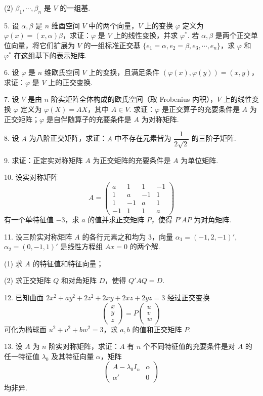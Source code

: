 \documentclass[UTF8,12pt,a4paper,fontset=fandol]{ctexart}
\begin{document}
(2) $\beta_1,\cdots,\beta_n$ 是 $V$ 的一组基.

5. 设 $\alpha,\beta$ 是 $n$ 维酉空间 $V$ 中的两个向量，$V$ 上的变换 $\varphi$ 定义为 $\varphi(x)=(x,\alpha)\beta$，求证：$\varphi$ 是 $V$ 上的线性变换，并求 $\varphi^*$. 若 $\alpha,\beta$ 是两个正交单位向量，将它们扩展为 $V$ 的一组标准正交基 $\{e_1=\alpha,e_2=\beta,e_3,\cdots,e_n\}$，求 $\varphi$ 和 $\varphi^*$ 在这组基下的表示矩阵.

6. 设 $\varphi$ 是 $n$ 维欧氏空间 $V$ 上的变换，且满足条件 $(\varphi(x),\varphi(y))=(x,y)$，求证：$\varphi$ 是 $V$ 上的正交变换.

7. 设 $V$ 是由 $n$ 阶实矩阵全体构成的欧氏空间（取 Frobenius 内积），$V$ 上的线性变换 $\varphi$ 定义为 $\varphi(X)=AX$，其中 $A\in V$. 求证：$\varphi$ 是正交算子的充要条件是 $A$ 为正交矩阵；$\varphi$ 是自伴随算子的充要条件是 $A$ 为对称矩阵.

8. 设 $A$ 为八阶正交矩阵，求证：$A$ 中不存在元素皆为 $\dfrac{1}{2\sqrt{2}}$ 的三阶子矩阵.

9. 求证：正定实对称矩阵 $A$ 为正交矩阵的充要条件是 $A$ 为单位矩阵.

10. 设实对称矩阵
\[
A=\begin{pmatrix}
a&1&1&-1\\
1&a&-1&1\\
1&-1&a&1\\
-1&1&1&a
\end{pmatrix}
\]
有一个单特征值 $-3$，求 $a$ 的值并求正交矩阵 $P$，使得 $P'AP$ 为对角矩阵.

11. 设三阶实对称矩阵 $A$ 的各行元素之和均为 $3$，向量 $\alpha_1=(-1,2,-1)'$, $\alpha_2=(0,-1,1)'$ 是线性方程组 $Ax=0$ 的两个解.

(1) 求 $A$ 的特征值和特征向量；

(2) 求正交矩阵 $Q$ 和对角矩阵 $D$，使得 $Q'AQ=D$.

12. 已知曲面 $2x^2+ay^2+2z^2+2xy+2xz+2yz=3$ 经过正交变换
\[
\begin{pmatrix}
x\\
y\\
z
\end{pmatrix}
=P
\begin{pmatrix}
u\\
v\\
w
\end{pmatrix}
\]
可化为椭球面 $u^2+v^2+bw^2=3$，求 $a,b$ 的值和正交矩阵 $P$.

13. 设 $A$ 为 $n$ 阶实对称矩阵，求证：$A$ 有 $n$ 个不同特征值的充要条件是对 $A$ 的任一特征值 $\lambda_0$ 及其特征向量 $\alpha$，矩阵
\[
\begin{pmatrix}
A-\lambda_0I_n&\alpha\\
\alpha'&0
\end{pmatrix}
\]
均非异.
\end{document}
